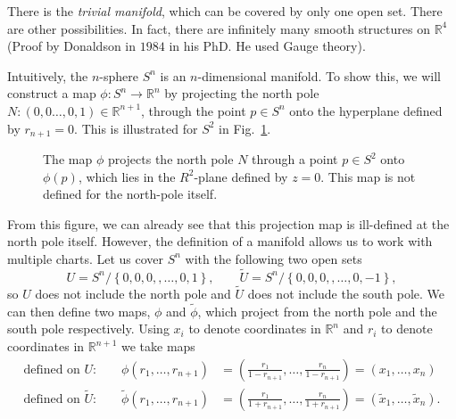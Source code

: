 \begin{example}[$M = \mathbb{R}^n$]
  There is the \emph{trivial manifold}, which can be covered by only one open set.
  There are other possibilities. In fact, there are infinitely many smooth structures on $\mathbb{R}^4$ (Proof by Donaldson in $1984$ in his PhD. He used Gauge theory).
\end{example}
\begin{example}[sphere $S^n = \left\{ \vb{r} \in \mathbb{R}^{n + 1}, \abs{\vb{r}} = 1 \right\}$ ]
  Intuitively, the $n$-sphere $S^n$ is an $n$-dimensional manifold. To show this, we will construct a map $\phi \colon S^n \to \mathbb{R}^n$ by projecting the north pole $N: (0, 0 \dots, 0, 1) \in \mathbb{R}^{n+1}$, through the point $p \in S^n$ onto the hyperplane defined by $r_{n+1} = 0$. This is illustrated for $S^2$ in Fig.~\ref{fig:l1f5}.
  \begin{figure}[tbhp]
    \centering
    \def\svgwidth{0.4\columnwidth}
    
    \caption{The map $\phi$ projects the north pole $N$ through a point $p \in S^2$ onto $\phi(p)$, which lies in the $R^2$-plane defined by $z = 0$. This map is not defined for the north-pole itself.}
    \label{fig:l1f5}
  \end{figure}
  From this figure, we can already see that this projection map is ill-defined at the north pole itself.
  However, the definition of a manifold allows us to work with multiple charts. Let us cover $S^n$ with the following two open sets 
  \begin{equation}
    U = S^n / \left\{ 0,0,0,, \dots, 0, 1 \right\}, \qquad
    \widetilde{U} = S^n / \left\{ 0,0,0,, \dots, 0, - 1 \right\},
  \end{equation}
  so $U$ does not include the north pole and $\widetilde{U}$ does not include the south pole.
  We can then define two maps, $\phi$ and $\widetilde{\phi}$, which project from the north pole and the south pole respectively.
  Using $x_i$ to denote coordinates in $\mathbb{R}^n$ and $r_i$ to denote coordinates in $\mathbb{R}^{n+1}$ we take maps
  \begin{align}
    \text{defined on $U$:} \qquad \phi(r_1, \dots, r_{n+1}) &= \left( \frac{r_1}{1 - r_{n+1}}, \dots, \frac{r_n}{1-r_{n+1}} \right) = (x_1 , \dots, x_n) \\
    \text{defined on $\widetilde U$:} \qquad \widetilde{\phi}(r_1, \dots, r_{n+1}) &= \left( \frac{r_1}{1 + r_{n+1}}, \dots, \frac{r_n}{1+r_{n+1}} \right) = (\widetilde{x}_1 , \dots, \widetilde{x}_n).
  \end{align}

\end{example}
